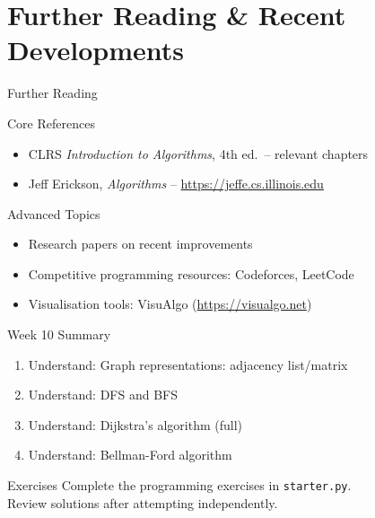 \documentclass[aspectratio=169,xcolor=dvipsnames]{beamer}
\begin{document}
\section{Further Reading \& Recent Developments}
\begin{frame}{Further Reading}
  \begin{block}{Core References}
    \begin{itemize}
      \item CLRS \textit{Introduction to Algorithms}, 4th ed.\ -- relevant chapters
      \item Jeff Erickson, \textit{Algorithms} -- \url{https://jeffe.cs.illinois.edu}
    \end{itemize}
  \end{block}
  \begin{exampleblock}{Advanced Topics}
    \begin{itemize}
      \item Research papers on recent improvements
      \item Competitive programming resources: Codeforces, LeetCode
      \item Visualisation tools: VisuAlgo (\url{https://visualgo.net})
    \end{itemize}
  \end{exampleblock}
\end{frame}

\begin{frame}{Week 10 Summary}
  \begin{enumerate}
    \item Understand: Graph representations: adjacency list/matrix
    \item Understand: DFS and BFS
    \item Understand: Dijkstra's algorithm (full)
    \item Understand: Bellman-Ford algorithm
  \end{enumerate}
  \begin{block}{Exercises}
    Complete the programming exercises in \texttt{starter.py}.\\
    Review solutions after attempting independently.
  \end{block}
\end{frame}
\end{document}
